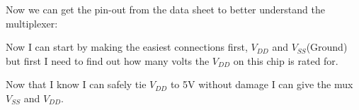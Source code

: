 \documentclass{article}
\begin{document}
Now we can get the pin-out from the data sheet to better understand the multiplexer:
\begin{center}
\end{center}
Now I can start by making the easiest connections first, $V_{DD}$ and $V_{SS}$(Ground) but first I need to find out how many volts the $V_{DD}$ on this chip is rated for. 
\begin{center}
\end{center}
Now that I know I can safely tie $V_{DD}$ to 5V without damage I can give the mux $V_{SS}$ and $V_{DD}.$
\end{document}
